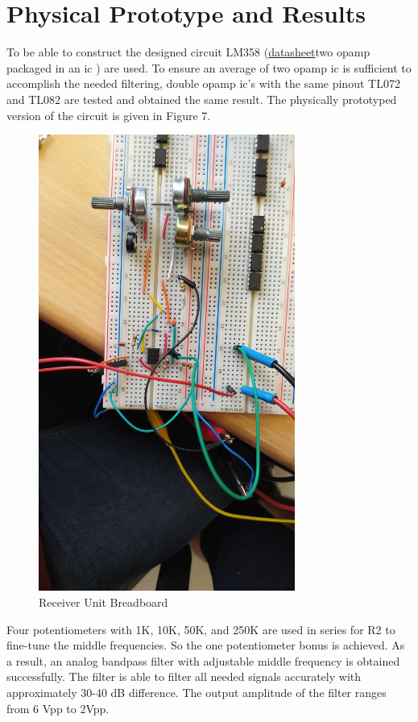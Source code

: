 \documentclass[letterpaper,12pt]{article}
\begin{document}
\section{Physical Prototype and Results}
To be able to construct the designed circuit LM358 (\href{https://pdf.direnc.net/upload/lm358-datasheet.pdf}{datasheet}two opamp packaged in an ic ) are used. To ensure an average of two opamp ic is sufficient to accomplish the needed filtering, double opamp ic's with the same pinout TL072 and TL082 are tested and obtained the same result. The physically prototyped version of the circuit is given in Figure 7.
\begin{figure}[H]
    \centering
    \includegraphics[width = 0.75\textwidth]{receiver_bread.jpg}
    \caption{Receiver Unit Breadboard}
\end{figure}
Four potentiometers with 1K, 10K, 50K, and 250K are used in series for R2 to fine-tune the middle frequencies. So the one potentiometer bonus is achieved.
As a result, an analog bandpass filter with adjustable middle frequency is obtained successfully. The filter is able to filter all needed signals accurately with approximately 30-40 dB difference. The output amplitude of the filter ranges from 6 Vpp to 2Vpp. 
\end{document}
